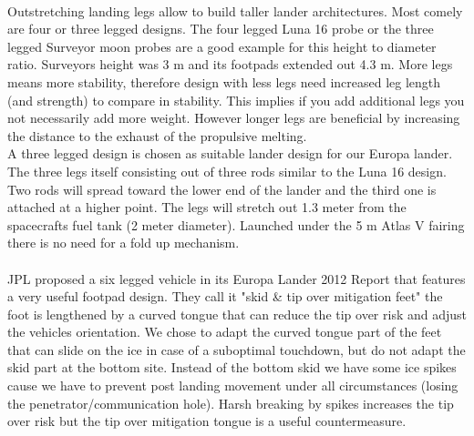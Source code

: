 \\
Outstretching landing legs allow to build taller lander architectures. Most comely are four or three legged designs. The four legged Luna 16 \cite{ZaryaLuna} probe or the three legged Surveyor \cite{NASASur} moon probes are a good example for this height to diameter ratio. Surveyors height was 3 m and its footpads extended out 4.3 m. More legs means more stability, therefore design with less legs need increased leg length (and strength) to compare in stability. This implies if you add additional legs you not necessarily add more weight. However longer legs are beneficial by increasing the distance to the exhaust of the propulsive melting. \\
A three legged design is chosen as suitable lander design for our Europa lander. The three legs itself consisting out of three rods similar to the Luna 16 design. Two rods will spread toward the lower end of the lander and the third one is attached at a higher point. The legs will stretch out 1.3 meter from the spacecrafts fuel tank (2 meter diameter).  Launched under the 5 m Atlas V fairing there is no need for a fold up mechanism.\\
\\
JPL proposed a six legged vehicle in its Europa Lander 2012 Report \cite{JPLEuropaRep} that features a very useful footpad design. They call it "skid \& tip over mitigation feet" the foot is lengthened by a curved tongue that can reduce the tip over risk and adjust the vehicles orientation. We chose to adapt the curved tongue part of the feet that can slide on the ice in case of a suboptimal touchdown, but do not adapt the skid part at the bottom site. Instead of the bottom skid we have some ice spikes cause we have to prevent post landing movement under all circumstances (losing the penetrator/communication hole). Harsh breaking by spikes increases the tip over risk but the tip over mitigation tongue is a useful countermeasure.

